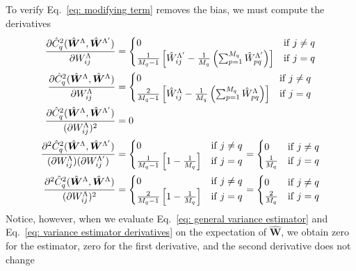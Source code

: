 \documentclass[%
 reprint,
 amsmath,amssymb,
 aps,nofootinbib,nobibnotes,onecolumn,prd
]{revtex4-2}
\begin{document}
To verify Eq.~\ref{eq: modifying term} removes the bias, we must compute the derivatives
\begin{align}
\frac{\partial \hat{C}^2_q(\hat{\bm W}^\Lambda, \hat{\bm W}^{\Lambda'})}{\partial W_{ij}^\Lambda} &= \begin{cases}
0 & {\rm if} \; j \neq q \\
\frac{1}{M_q-1}\left[\hat{W}_{ij}^{\Lambda'} - \frac{1}{M_q}\left(\sum_{p=1}^{M_q}\hat{W}_{pq}^{\Lambda'}\right)\right] & {\rm if}\; j = q 
\end{cases} \nonumber
\\
\frac{\partial \hat{C}^2_q(\hat{\bm W}^\Lambda, \hat{\bm W}^{\Lambda})}{\partial W_{ij}^\Lambda} &= \begin{cases}
0 & {\rm if} \; j \neq q \\
\frac{2}{M_q-1}\left[\hat{W}_{ij}^{\Lambda} - \frac{1}{M_q}\left(\sum_{p=1}^{M_q}\hat{W}_{pq}^{\Lambda}\right)\right] & {\rm if}\; j = q 
\end{cases} \nonumber
\\
\frac{\partial \hat{C}^2_q(\hat{\bm W}^\Lambda, \hat{\bm W}^{\Lambda'})}{(\partial W_{ij}^\Lambda)^2} &= 0 \nonumber
\\
\frac{\partial^2 \hat{C}^2_q(\hat{\bm W}^\Lambda, \hat{\bm W}^{\Lambda'})}{(\partial W_{ij}^\Lambda)(\partial W_{ij}^{\Lambda'})} &= \begin{cases}
0 & {\rm if} \; j \neq q \\
\frac{1}{M_q-1}\left[1 - \frac{1}{M_q}\right] & {\rm if}\; j = q 
\end{cases} = \begin{cases}
0 & {\rm if} \; j \neq q \\
\frac{1}{M_q} & {\rm if}\; j = q \end{cases} \nonumber
\\
\frac{\partial^2 \hat{C}^2_q(\hat{\bm W}^\Lambda, \hat{\bm W}^{\Lambda})}{(\partial W_{ij}^\Lambda)^2} &= \begin{cases}
0 & {\rm if} \; j \neq q \\
\frac{2}{M_q-1}\left[1 - \frac{1}{M_q}\right] & {\rm if}\; j = q 
\end{cases} = \begin{cases}
0 & {\rm if} \; j \neq q \\
\frac{2}{M_q} & {\rm if}\; j = q 
\end{cases}
\label{eq: variance estimator derivatives}
\end{align}
Notice, however, when we evaluate Eq.~\ref{eq: general variance estimator} and Eq.~\ref{eq: variance estimator derivatives} on the expectation of $\hat{\bm W}$, we obtain zero for the estimator, zero for the first derivative, and the second derivative does not change
\end{document}
